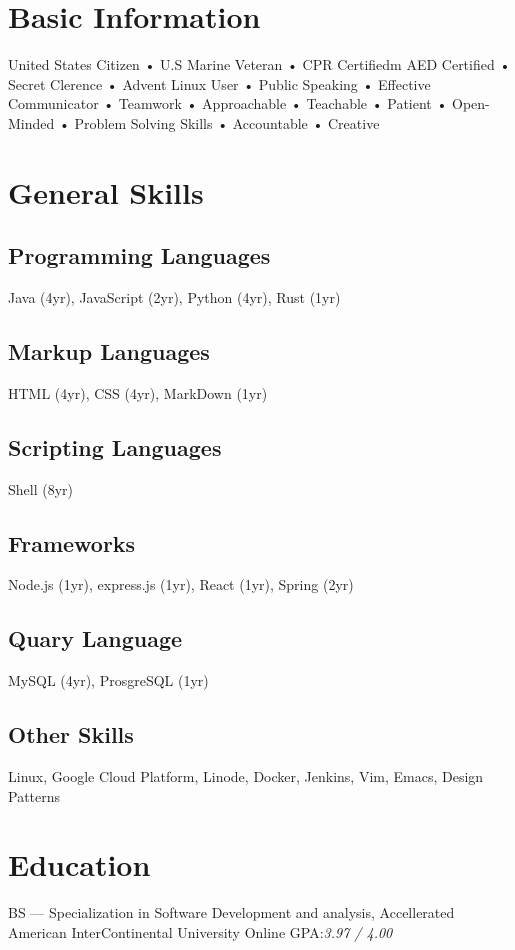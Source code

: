 \documentclass{resume-class/nadario_resume}
\begin{document}
\makecvtitle{}
\section{Basic Information}
\begin{center}
United States Citizen • U.S Marine Veteran • CPR Certifiedm AED Certified • Secret
Clerence • Advent Linux User • Public Speaking • Effective Communicator •
Teamwork • Approachable • Teachable • Patient • Open-Minded • Problem Solving Skills • Accountable • Creative
\end{center}

\section{General Skills}
\subsection{Programming Languages}
Java (4yr), JavaScript (2yr), Python (4yr), Rust (1yr)
\subsection{Markup Languages}
HTML (4yr), CSS (4yr), MarkDown (1yr)
\subsection{Scripting Languages}
Shell (8yr)
\subsection{Frameworks}
Node.js (1yr), express.js (1yr), React (1yr), Spring (2yr)
\subsection{Quary Language}
MySQL (4yr), ProsgreSQL (1yr)
\subsection{Other Skills}
Linux, Google Cloud Platform, Linode, Docker, Jenkins, Vim, Emacs, Design
Patterns

\section{Education}
        {BS --- Specialization in Software Development and analysis, Accellerated}
        {American InterContinental University}
        {Online}
        {}{GPA:\textit{3.97 / 4.00}}
        \vspace{.25cm}
\end{document}
